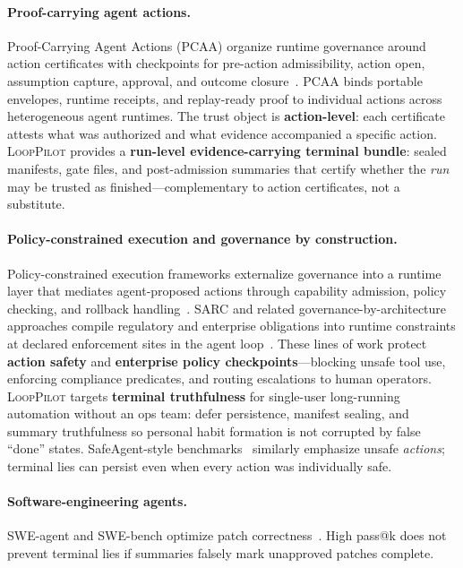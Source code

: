 \documentclass[11pt]{article}
\newcommand{\looppilot}{\textsc{LoopPilot}}
\begin{document}
\paragraph{Proof-carrying agent actions.}
Proof-Carrying Agent Actions (PCAA) organize runtime governance around action certificates with checkpoints for pre-action admissibility, action open, assumption capture, approval, and outcome closure~\cite{wang2026pcaa}.
PCAA binds portable envelopes, runtime receipts, and replay-ready proof to individual actions across heterogeneous agent runtimes.
The trust object is \textbf{action-level}: each certificate attests what was authorized and what evidence accompanied a specific action.
\looppilot{} provides a \textbf{run-level evidence-carrying terminal bundle}: sealed manifests, gate files, and post-admission summaries that certify whether the \emph{run} may be trusted as finished---complementary to action certificates, not a substitute.

\paragraph{Policy-constrained execution and governance by construction.}
Policy-constrained execution frameworks externalize governance into a runtime layer that mediates agent-proposed actions through capability admission, policy checking, and rollback handling~\cite{qin2026policy}.
SARC and related governance-by-architecture approaches compile regulatory and enterprise obligations into runtime constraints at declared enforcement sites in the agent loop~\cite{besanson2026sarc}.
These lines of work protect \textbf{action safety} and \textbf{enterprise policy checkpoints}---blocking unsafe tool use, enforcing compliance predicates, and routing escalations to human operators.
\looppilot{} targets \textbf{terminal truthfulness} for single-user long-running automation without an ops team: defer persistence, manifest sealing, and summary truthfulness so personal habit formation is not corrupted by false ``done'' states.
SafeAgent-style benchmarks~\cite{safeagent2024} similarly emphasize unsafe \emph{actions}; terminal lies can persist even when every action was individually safe.

\paragraph{Software-engineering agents.}
SWE-agent and SWE-bench optimize patch correctness~\cite{yang2024sweagent,jimenez2024swebench}.
High pass@k does not prevent terminal lies if summaries falsely mark unapproved patches complete.
\end{document}
